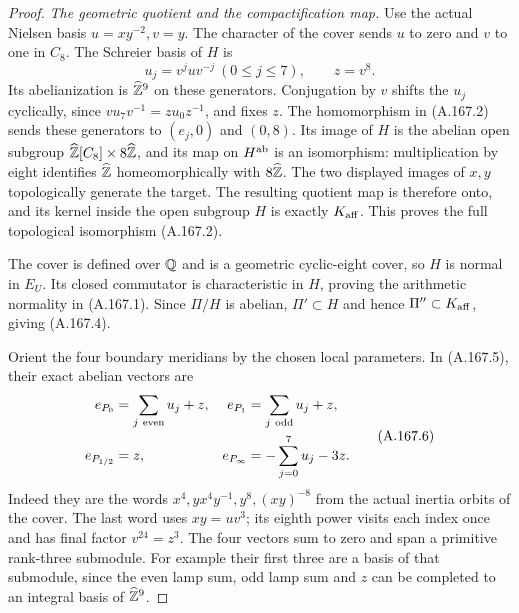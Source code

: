 \begin{proof}
\emph{The geometric quotient and the compactification map.}
Use the actual Nielsen basis \(u=xy^{-2},v=y\).  The character of
the cover sends \(u\) to zero and \(v\) to one in \(C_8\).
The Schreier basis of \(H\) is
\[
          u_j=v^juv^{-j}\ (0\leq j\leq7),\qquad z=v^8.
\tag{A.167.5}
\]
Its abelianization is \(\widehat{\mathbb Z}^9\) on these generators.
Conjugation by \(v\) shifts the \(u_j\) cyclically, since
\(v u_7v^{-1}=z u_0z^{-1}\), and fixes \(z\).
The homomorphism in (A.167.2) sends these generators to
\((e_j,0)\) and \((0,8)\).  Its image of \(H\) is the
abelian open subgroup
\(\widehat{\mathbb Z}[C_8]\times8\widehat{\mathbb Z}\), and its map on
\(H^{\rm ab}\) is an isomorphism: multiplication by eight identifies
\(\widehat{\mathbb Z}\) homeomorphically with \(8\widehat{\mathbb Z}\).
The two displayed images of \(x,y\) topologically generate the
target.  The resulting quotient map is therefore onto, and its kernel
inside the open subgroup \(H\) is exactly \(K_{\rm aff}\).
This proves the full topological isomorphism (A.167.2).

The cover is defined over \(\mathbb Q\) and is a geometric cyclic-eight
cover, so \(H\) is normal in \(E_U\).  Its closed commutator is
characteristic in \(H\), proving the arithmetic normality in
(A.167.1).  Since \(\Pi/H\) is abelian, \(\Pi'\subset H\)
and hence \(\Pi''\subset K_{\rm aff}\), giving (A.167.4).

Orient the four boundary meridians by the chosen local parameters.
In (A.167.5), their exact abelian vectors are
\[
 \begin{aligned}
 e_{P_0}&=\sum_{j\ {\rm even}}u_j+z,
 &e_{P_1}&=\sum_{j\ {\rm odd}}u_j+z,\\
 e_{P_{1/2}}&=z,
 &e_{P_\infty}&=-\sum_{j=0}^7u_j-3z.
 \end{aligned}
\tag{A.167.6}
\]
Indeed they are the words \(x^4,yx^4y^{-1},y^8,(xy)^{-8}\)
from the actual inertia orbits of the cover.  The last word uses
\(xy=uv^3\); its eighth power visits each index once and has final
factor \(v^{24}=z^3\).  The four vectors sum to zero and span a
primitive rank-three submodule.  For example their first three are a
basis of that submodule, since the even lamp sum, odd lamp sum and
\(z\) can be completed to an integral basis of \(\widehat{\mathbb Z}^9\).


\end{proof}
